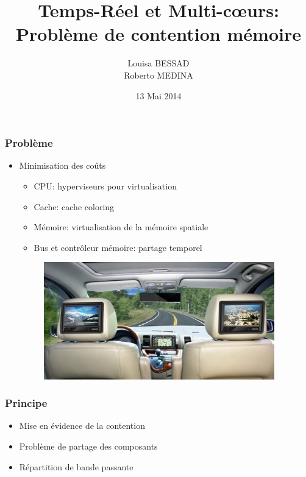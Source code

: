 \documentclass{beamer}
\title[PSAR 2014]{Temps-Réel et Multi-c\oe urs:\\Problème de contention mémoire}
\author{Louisa BESSAD\\ Roberto MEDINA}
\date{13 Mai 2014}
\begin{document}
    \transdissolve

    \begin{frame}
        \titlepage
    \end{frame}

    \begin{frame}[label=probleme]
    \frametitle{Problème}
        \begin{itemize}
            \item Minimisation des coûts
            \begin{itemize}
                \item CPU: hyperviseurs pour virtualisation
                \item Cache: cache coloring
                \item Mémoire: virtualisation de la mémoire spatiale
                \item Bus et contrôleur mémoire: partage temporel
            \end{itemize}
            \begin{figure}
                \includegraphics[width=10cm]{car.eps}
            \end{figure}
        \end{itemize}
    \end{frame}

    \begin{frame}[label=principe]
    \frametitle{Principe}
        \begin{itemize}
            \item Mise en évidence de la contention
            \item Problème de partage des composants
            \item Répartition de bande passante
        \end{itemize}
    \end{frame}
\end{document}
